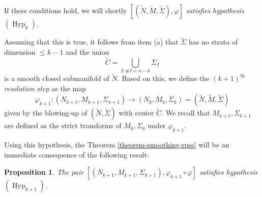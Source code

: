 \documentclass[11pt,psamsfonts]{article}
\newcommand{\nobracket}{}
\newcommand{\tmem}[1]{{\em #1\/}}
\newcommand{\tmop}[1]{\ensuremath{\operatorname{#1}}}
\newtheorem{Proposition}[Theorem]{Proposition}
\theoremstyle{definition}
\theoremstyle{remark}
\begin{document}
If these conditions hold, we will shortly $[(\tilde{N},\tilde{M},
\tilde{\Sigma}), \varphi]$ {\tmem{satisfies hypothesis}} $(\tmop{Hyp}_k)$.


Assuming that this is true, it follows from item (a) that $\tilde{\Sigma}$
has no strata of dimension $\leqslant k - 1$ and the union
\[ \tilde{C} = \bigcup_{I : \#I = n - k} \Sigma_I \]
is a smooth closed submanifold of $\tilde{N}$. Based on this, we define the
$(k + 1)^{\tmop{th}}$ {\tmem{resolution step}} as the map
\begin{equation}
  \varphi_{k + 1} : (N_{k + 1},M_{k+1}, \Sigma_{k + 1}) \longrightarrow (N_k,M_k,
  \Sigma_k) = (\tilde{N}, \tilde{M},\tilde{\Sigma}) \label{k-blowing-up}
\end{equation}
given by the blowing-up of $(\tilde{N}, \tilde{\Sigma})$ with center
$\tilde{C}$. We recall that $M_{k+1},\Sigma_{k + 1}$ are defined as the strict
transforms of $M_k,\Sigma_k$ under $\varphi_{k + 1}$.

Using this hypothesis, the Theorem \ref{theorem-smoothing-rpss} will be an immediate consequence of the following result:
\begin{Proposition}
  The pair $[(\nobracket N_{k + 1}, M_{k+1},\Sigma_{k + 1}), \varphi_{k + 1} \circ
  \varphi \nobracket]$ satisfies hypothesis $(\tmop{Hyp}_{k + 1})$. 
\end{Proposition}
\end{document}
